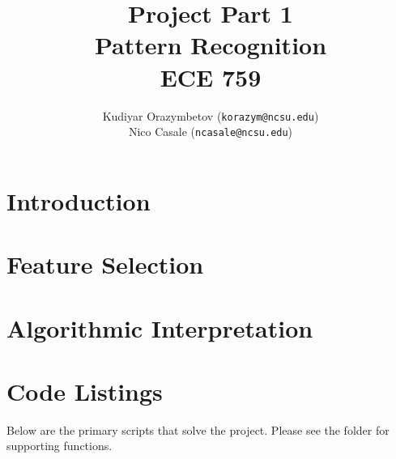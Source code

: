 \documentclass[]{ncmathy}
\newcommand{\theassignment}{Project Part 1}
\newcommand{\thecourse}{Pattern Recognition\\ECE 759}
\begin{document}
\title{\theassignment\\\thecourse}
\author{Kudiyar Orazymbetov (\texttt{korazym@ncsu.edu})\\Nico Casale (\texttt{ncasale@ncsu.edu})}

\makeFancyTitle

\tableofcontents
\listoffigures
\lstlistoflistings

\pagebreak

\section{Introduction} 
	

\section{Feature Selection}

\section{Algorithmic Interpretation}

\section{Code Listings}

Below are the primary scripts that solve the project. Please see the
 folder for supporting functions.

%
\end{document}
